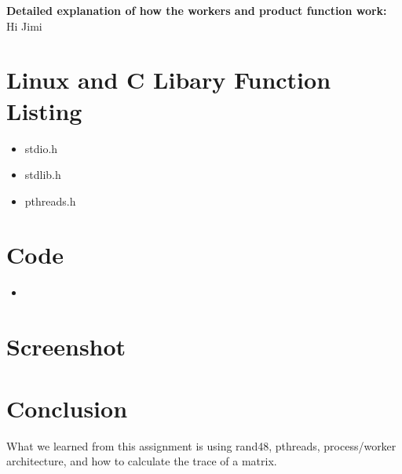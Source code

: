 \documentclass{article}
\newcommand{\insertcode}[2]{
\begin{itemize}
\item[]
\end{itemize}
}
\begin{document}
\textbf{\Large{Detailed explanation of how the workers and product function work:}}\\

Hi Jimi
\clearpage


\section{Linux and C Libary Function Listing}
\begin{itemize}
    \item stdio.h
    \item stdlib.h
    \item pthreads.h
\end{itemize}
\clearpage



\section{Code}
\insertcode{main}{Matrix Multiplication of nxn matrices using p\_threads}
\clearpage


\section{Screenshot}
\begin{center}
\end{center}
\clearpage



\section{Conclusion}
What we learned from this assignment is using rand48, pthreads, process/worker architecture, and how to calculate the trace of a matrix.
\end{document}

